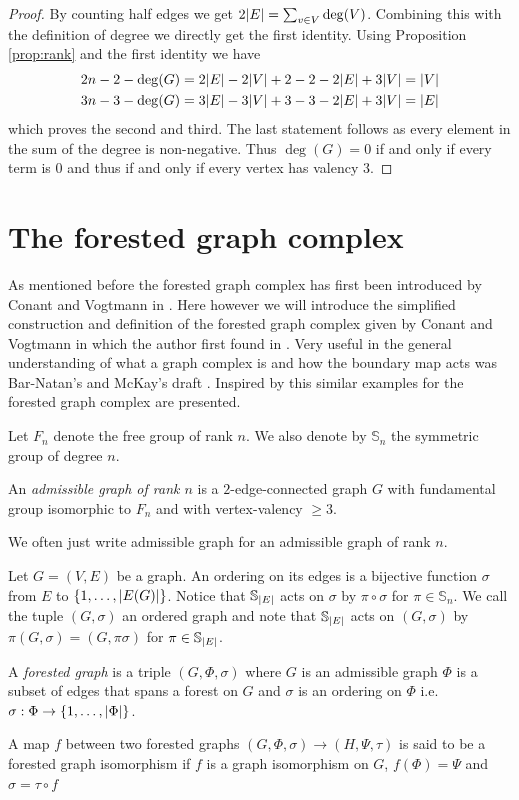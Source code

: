 \begin{proof}
	By counting half edges we get $2 \abs{E} = \sum_{v \in V} \deg(V)$.
	Combining this with the definition of degree we directly get the first identity.
	Using Proposition \ref{prop:rank} and the first identity we have
	\begin{align*}
		2 n -2 - \deg(G) &= 2 \abs{E} - 2 \abs{V} + 2 - 2 - 2\abs{E} + 3 \abs{V} = \abs{V}\\
		3 n -3 - \deg(G) &= 3 \abs{E} - 3 \abs{V} + 3 - 3 - 2\abs{E} + 3 \abs{V} = \abs{E}
	\end{align*}
	which proves the second and third. The last statement follows as every element in the sum of the degree is non-negative.
	Thus $\deg(G) = 0$ if and only if every term is $0$ and thus if and only if every vertex has valency $3$.
\end{proof}

\section{The forested graph complex}
As mentioned before the forested graph complex has first been introduced by Conant and Vogtmann in \cite{conant03}.
Here however we will introduce the simplified construction and definition of the forested graph complex given by Conant and Vogtmann in \cite{conant08} 
which the author first found in \cite{bartholdi16}.
Very useful in the general understanding of  what a graph complex is and how the boundary map acts was Bar-Natan's and McKay's draft \cite{natan01}.
Inspired by this similar examples for the forested graph complex are presented.

Let $F_{n}$ denote the free group of rank $n$. We also denote by $\mathbb{S}_{n}$ the symmetric group of degree $n$.
\begin{definition}
	An \emph{admissible graph of rank $n$} is a $2$-edge-connected graph $G$ with fundamental group isomorphic to $F_{n}$ and with vertex-valency $\geq 3$.
\end{definition}

We often just write admissible graph for an admissible graph of rank $n$.

\begin{definition}
	Let $G = (V,E)$ be a graph. An ordering on its edges is a bijective function $\sigma$ from $E$ to $\{1,\ldots,\abs{E(G)}\}$.
	Notice that $\mathbb{S}_{\abs{E}}$ acts on $\sigma$ by $\pi \circ \sigma$ for $\pi \in \mathbb{S}_{n}$.
	We call the tuple $(G,\sigma)$ an ordered graph and note that $\mathbb{S}_{\abs{E}}$ acts on $(G,\sigma)$ by $\pi (G,\sigma) = (G,\pi \sigma)$ for $\pi \in \mathbb{S}_{\abs{E}}$.

	A \emph{forested graph} is a triple $(G,\Phi,\sigma)$ where $G$ is an admissible graph $\Phi$ is a subset of edges that spans a forest on $G$ and 
	$\sigma$ is an ordering on $\Phi$ i.e. $\sigma : \Phi \to \{1,\ldots,\abs{\Phi}\}$.

	A map $f$ between two forested graphs $(G,\Phi, \sigma) \to (H,\Psi, \tau)$ is said to be a forested graph isomorphism if 
	$f$ is a graph isomorphism on $G$,  $f(\Phi) = \Psi$ and $\sigma = \tau \circ f $
\end{definition}

